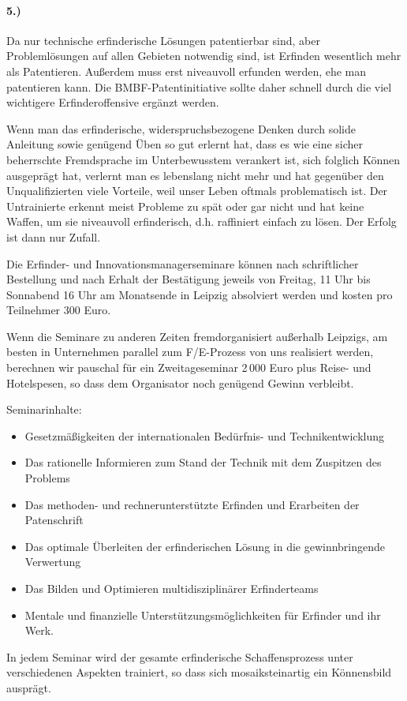 \documentclass[11pt,a4paper]{article}
\begin{document}
\paragraph{5.)}
Da nur technische erfinderische Lösungen patentierbar sind, aber
Problemlösungen auf allen Gebieten notwendig sind, ist Erfinden wesentlich
mehr als Patentieren. Außerdem muss erst niveauvoll erfunden werden, ehe man
patentieren kann.  Die BMBF-Patentinitiative sollte daher schnell durch die
viel wichtigere Erfinderoffensive ergänzt werden.

Wenn man das erfinderische, widerspruchsbezogene Denken durch solide Anleitung
sowie genügend Üben so gut erlernt hat, dass es wie eine sicher beherrschte
Fremdsprache im Unterbewusstem verankert ist, sich folglich Können ausgeprägt
hat, verlernt man es lebenslang nicht mehr und hat gegenüber den
Unqualifizierten viele Vorteile, weil unser Leben oftmals problematisch ist.
Der Untrainierte erkennt meist Probleme zu spät oder gar nicht und hat keine
Waffen, um sie niveauvoll erfinderisch, d.h. raffiniert einfach zu lösen. Der
Erfolg ist dann nur Zufall.

Die Erfinder- und Innovationsmanagerseminare können nach schriftlicher
Bestellung und nach Erhalt der Bestätigung jeweils von Freitag, 11 Uhr bis
Sonnabend 16 Uhr am Monatsende in Leipzig absolviert werden und kosten pro
Teilnehmer 300 Euro.

Wenn die Seminare zu anderen Zeiten fremdorganisiert außerhalb Leipzigs, am
besten in Unternehmen parallel zum F/E-Prozess von uns realisiert werden,
berechnen wir pauschal für ein Zweitageseminar 2\,000 Euro plus Reise- und
Hotelspesen, so dass dem Organisator noch genügend Gewinn verbleibt.

Seminarinhalte:
\begin{itemize}[noitemsep]\enlargethispage{1em}
\item Gesetzmäßigkeiten der internationalen Bedürfnis- und Technikentwicklung
\item Das rationelle Informieren zum Stand der Technik mit dem Zuspitzen des
  Problems
\item Das methoden- und rechnerunterstützte Erfinden und Erarbeiten der
  Patenschrift
\item Das optimale Überleiten der erfinderischen Lösung in die gewinnbringende
  Verwertung
\item Das Bilden und Optimieren multidisziplinärer Erfinderteams
\item Mentale und finanzielle Unterstützungsmöglichkeiten für Erfinder und ihr
  Werk.
\end{itemize}
In jedem Seminar wird der gesamte erfinderische Schaffensprozess unter
verschiedenen Aspekten trainiert, so dass sich mosaiksteinartig ein
Könnensbild ausprägt.
\end{document}
